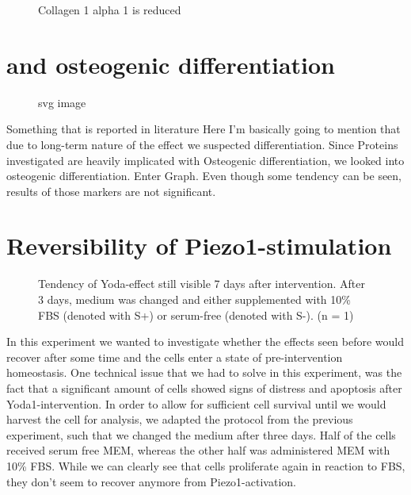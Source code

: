 \begin{figure}[htbp]
  \centering
  
  \caption{Collagen 1 alpha 1 is reduced }
\end{figure}


\section{\Piezo and osteogenic differentiation}

\begin{figure}[htbp]
  \centering
  
  \caption{svg image}
\end{figure}

Something that is reported in literature Here I'm basically going to mention that due to long-term nature of the effect we suspected differentiation. Since Proteins investigated are heavily implicated with Osteogenic differentiation, we looked into osteogenic differentiation. Enter Graph. Even though some tendency can be seen, results of those markers are not significant. 

\section{Reversibility of Piezo1-stimulation}


\begin{figure}
    \centering
    
    \caption{Tendency of Yoda-effect still visible 7 days after intervention. After 3 days, medium was changed and either supplemented with 10\% FBS (denoted with S+) or serum-free (denoted with S-). (n = 1)}
    \label{fig:my_label}
\end{figure}

In this experiment we wanted to investigate whether the effects seen before would recover after some time and the cells enter a state of pre-intervention homeostasis. One technical issue that we had to solve in this experiment, was the fact that a significant amount of cells showed signs of distress and apoptosis after Yoda1-intervention. In order to allow for sufficient cell survival until we would harvest the cell for analysis, we adapted the protocol from the previous experiment, such that we changed the medium after three days. Half of the cells received serum free MEM\textalpha{}, whereas the other half was administered MEM\textalpha{} with 10\% FBS. 
While we can clearly see that cells proliferate again in reaction to FBS, they don't seem to recover anymore from Piezo1-activation. 

